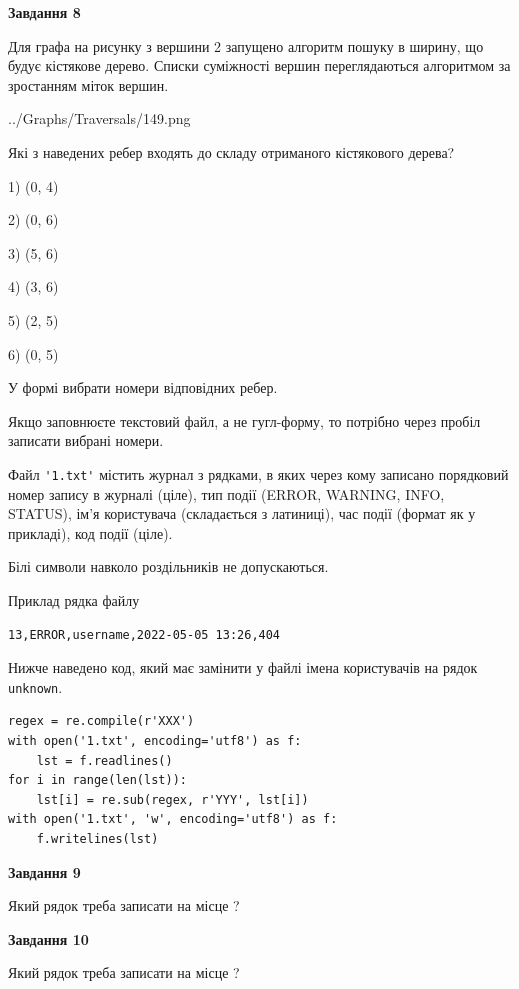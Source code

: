 \documentclass[12pt, ukrainian]{article}
\def\code#1{\Verb!#1!}
\begin{document}
{\begin {large}
{\begin {center}\textbf{Завдання 8}\end {center}}\par
Для графа на рисунку з вершини 2 запущено алгоритм пошуку в ширину, що будує кістякове дерево. Списки суміжності вершин переглядаються алгоритмом за зростанням міток вершин.\par
\begin{center}
	{../Graphs/Traversals/149.png}
\end{center}
\par Які з наведених ребер входять до складу отриманого кістякового дерева?\par
1) (0, 4)\par
2) (0, 6)\par
3) (5, 6)\par
4) (3, 6)\par
5) (2, 5)\par
6) (0, 5)\par
{\vskip 15pt} У формі вибрати номери відповідних ребер.


Якщо заповнюєте текстовий файл, а не гугл-форму, то потрібно через пробіл записа\-ти вибрані номери.\par
\newpage


Файл \code{'1.txt'} містить журнал з рядками, в яких через кому записано поряд\-ко\-вий номер запису в журналі (ціле), тип події (ERROR, WARNING, INFO, STATUS), ім'я користувача (складається з латиниці), час події (фор\-мат як у прикладі), код події (ціле).

Білі символи навколо роздільників не допускаються.

Приклад рядка файлу



\begin{verbatim}
13,ERROR,username,2022-05-05 13:26,404
\end{verbatim}


Нижче наведено код, який має замінити у файлі імена користувачів на рядок \code{unknown}.



\begin{verbatim}
regex = re.compile(r'XXX')
with open('1.txt', encoding='utf8') as f:
    lst = f.readlines()
for i in range(len(lst)):
    lst[i] = re.sub(regex, r'YYY', lst[i])
with open('1.txt', 'w', encoding='utf8') as f:
    f.writelines(lst)
\end{verbatim}




{\begin {center}\textbf{Завдання 9}\end {center}}\par
Який рядок треба записати на місце  ?\par
\vspace{5mm}


{\begin {center}\textbf{Завдання 10}\end {center}}\par
Який рядок треба записати на місце  ?\par


\newpage


\end {large}}
\end{document}
